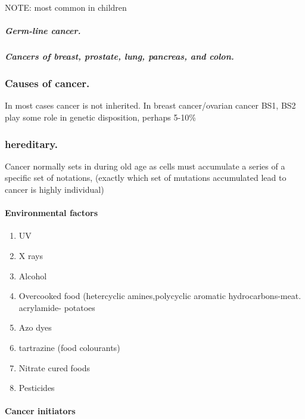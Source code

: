 \documentclass[]{article}
\providecommand{\tightlist}{%
  \setlength{\itemsep}{0pt}\setlength{\parskip}{0pt}}
\let\oldparagraph\paragraph
\renewcommand{\paragraph}[1]{\oldparagraph{#1}\mbox{}}
\let\oldsubparagraph\subparagraph
\renewcommand{\subparagraph}[1]{\oldsubparagraph{#1}\mbox{}}
\begin{document}
NOTE: most common in children

\hypertarget{germ-line-cancer.}{%
\subparagraph{Germ-line cancer.}\label{germ-line-cancer.}}

\hypertarget{cancers-of-breast-prostate-lung-pancreas-and-colon.}{%
\subparagraph{Cancers of breast, prostate, lung, pancreas, and
colon.}\label{cancers-of-breast-prostate-lung-pancreas-and-colon.}}

\hypertarget{causes-of-cancer.}{%
\subsubsection{Causes of cancer.}\label{causes-of-cancer.}}

In most cases cancer is not inherited. In breast cancer/ovarian cancer
BS1, BS2 play some role in genetic disposition, perhaps 5-10\%

\hypertarget{hereditary.}{%
\subsubsection{hereditary.}\label{hereditary.}}

Cancer normally sets in during old age as cells must accumulate a series
of a specific set of notations, (exactly which set of mutations
accumulated lead to cancer is highly individual)

\hypertarget{environmental-factors}{%
\paragraph{Environmental factors}\label{environmental-factors}}

\begin{enumerate}
\def\labelenumi{\arabic{enumi}.}
\tightlist
\item
  UV
\item
  X rays
\item
  Alcohol
\item
  Overcooked food (hetercyclic amines,polycyclic aromatic
  hydrocarbons-meat. acrylamide- potatoes
\item
  Azo dyes
\item
  tartrazine (food colourants)
\item
  Nitrate cured foods
\item
  Pesticides
\end{enumerate}

\hypertarget{cancer-initiators}{%
\paragraph{Cancer initiators}\label{cancer-initiators}}
\end{document}

